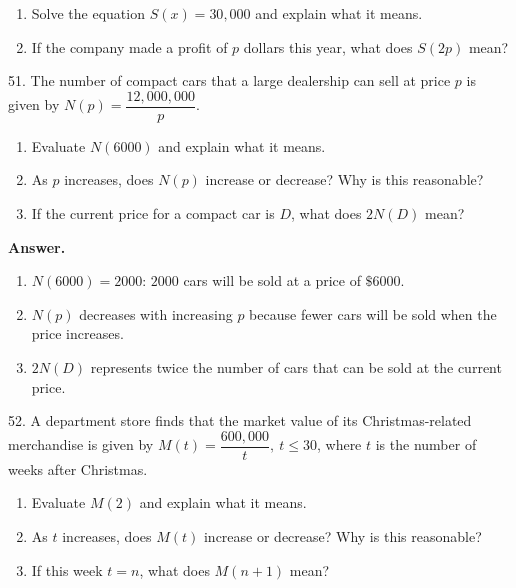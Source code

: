 \documentclass[10pt,]{book}
\theoremstyle{plain}
\theoremstyle{definition}
\theoremstyle{definition}
\theoremstyle{definition}
\begin{document}
\begin{exerciselist}
\begin{enumerate}[label=\alph*]
\item\hypertarget{li-202}{}Solve the equation \(S(x) = 30,000\) and explain what it means.%
\item\hypertarget{li-203}{}If the company made a profit of \(p\) dollars this year, what does \(S(2p)\) mean?%
\end{enumerate}
%
\par\smallskip
\item[51.]\hypertarget{exercise-61}{}The number of compact cars that a large dealership can sell at price \(p\) is given by \(N( p) = \dfrac{12,000,000}{p}\). \leavevmode%
\begin{enumerate}[label=\alph*]
\item\hypertarget{li-204}{}Evaluate \(N(6000)\) and explain what it means.%
\item\hypertarget{li-205}{}As \(p\) increases, does \(N(p)\) increase or decrease? Why is this reasonable?%
\item\hypertarget{li-206}{}If the current price for a compact car is \(D\), what does \(2N(D)\) mean?%
\end{enumerate}
%
\par\smallskip
\par\smallskip
\noindent\textbf{Answer.}\hypertarget{answer-36}{}\quad
\leavevmode%
\begin{enumerate}[label=\alph*]
\item\hypertarget{li-207}{}\(N(6000) = 2000\): \(2000\) cars will be sold at a price of \(\$6000\).%
\item\hypertarget{li-208}{}\(N(p)\) decreases with increasing \(p\) because fewer cars will be sold when the price increases.%
\item\hypertarget{li-209}{}\(2N(D)\) represents twice the number of cars that can be sold at the current price.%
\end{enumerate}
%
\item[52.]\hypertarget{exercise-62}{}A department store finds that the market value of its Christmas-related merchandise is given by \(M(t) = \dfrac{600,000}{t},~ t\le 30\), where \(t\) is the number of weeks after Christmas. \leavevmode%
\begin{enumerate}[label=\alph*]
\item\hypertarget{li-210}{}Evaluate \(M(2)\) and explain what it means.%
\item\hypertarget{li-211}{}As \(t\) increases, does \(M(t)\) increase or decrease? Why is this reasonable?%
\item\hypertarget{li-212}{}If this week \(t = n\), what does \(M(n + 1)\) mean?%

\end{enumerate}
\end{exerciselist}
\end{document}
